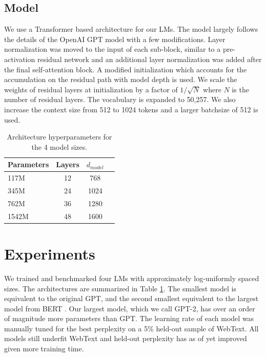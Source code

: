 \documentclass{article}
\begin{document}
\subsection{Model}

We use a Transformer \cite{vaswani2017attention} based architecture for our LMs. The model largely follows the details of the OpenAI GPT model \cite{radford2018improving} with a few modifications. Layer normalization \cite{ba2016layer} was moved to the input of each sub-block, similar to a pre-activation residual network \cite{he2016identity} and an additional layer normalization was added after the final self-attention block. A modified initialization which accounts for the accumulation on the residual path with model depth is used. We scale the weights of residual layers at initialization by a factor of $1/\sqrt N$ where $N$ is the number of residual layers. The vocabulary is expanded to 50,257. We also increase the context size from 512 to 1024 tokens and a larger batchsize of 512 is used.

\begin{table}[t]
\vskip 0.15in
\begin{center}
\begin{small}
\begin{tabular}{lccc}
\toprule
Parameters & Layers & $d_{model}$ \\
\midrule
117M  & 12 & 768  \\
345M  & 24 & 1024  \\
762M  & 36 & 1280  \\
1542M & 48 & 1600  \\
\bottomrule
\end{tabular}
\end{small}
\caption{Architecture hyperparameters for the 4 model sizes.}
\label{model}
\end{center}
\vskip -0.1in
\end{table}

\section{Experiments}
\label{experiments}

We trained and benchmarked four LMs with approximately log-uniformly spaced sizes.  The architectures are summarized in Table \ref{model}.  The smallest model is equivalent to the original GPT, and the second smallest equivalent to the largest model from BERT \cite{devlin2018bert}. Our largest model, which we call GPT-2, has over an order of magnitude more parameters than GPT.
The learning rate of each model was manually tuned for the best perplexity on a 5\% held-out sample of WebText. All models still underfit WebText and held-out perplexity has as of yet improved given more training time.
\end{document}
